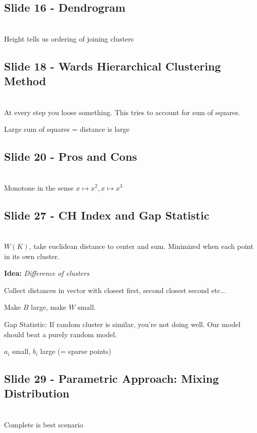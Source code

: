 \subsection{Slide 16 - Dendrogram}\hfill\\
\noindent Height tells us ordering of joining clusters
\par\bigskip
\subsection{Slide 18 - Wards Hierarchical Clustering Method}\hfill\\
\noindent At every step you loose something. This tries to account for sum of squares.\par
\noindent Large sum of squares = distance is large
\par\bigskip
\subsection{Slide 20 - Pros and Cons}\hfill\\
\noindent Monotone in the sense $x\mapsto x^2, x\mapsto x^3$
\par\bigskip
\subsection{Slide 27 - CH Index and Gap Statistic}\hfill\\
\noindent $W(K)$, take euclidean distance to center and sum. Minimized when each point in its own cluster.
\par\bigskip
\noindent\textbf{Idea:} \textit{Difference of clusters} \par
\noindent Collect distances in vector with closest first, second closest second etc...\par
\noindent Make $B$ large, make $W$ small.
\par\bigskip
\noindent Gap Statistic: If random cluster is similar, you're not doing well. Our model should beat a purely random model.
\par\bigskip
\noindent $a_i$ small, $b_i$ large (= sparse points)
\par\bigskip
\subsection{Slide 29 - Parametric Approach: Mixing Distribution}\hfill\\
\noindent Complete is best scenario
\par\bigskip
